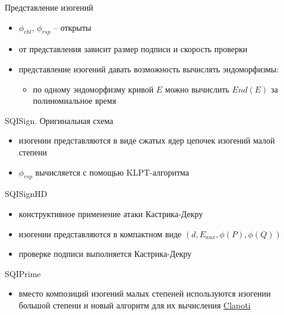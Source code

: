 \documentclass{beamer}
\begin{document}
\begin{frame}{Представление изогений}
	\begin{itemize}
		\item $\phi_{chl}$, $\phi_{rsp}$ -- открыты
		\item от представления зависит размер подписи и скорость проверки
		\item представление изогений  давать возможность вычислять эндоморфизмы:
		\begin{itemize}
			\item по одному эндоморфизму кривой $E$ можно вычислить $End(E)$ за полиномиальное время
		\end{itemize}
	\end{itemize}
\end{frame}

\begin{frame}{SQISign. Оригинальная схема}
	\begin{itemize}
		\item изогении представляются в виде сжатых ядер цепочек изогений малой степени
		\item $\phi_{rsp}$ вычисляется с помощью KLPT-алгоритма
	\end{itemize}
\end{frame}

\begin{frame}{SQISignHD}
	\begin{itemize}
		\item конструктивное применение атаки Кастрика-Декру
		\item изогении представляются в компактном виде $(d, E_{aux}, \phi(P), \phi(Q))$
		\item проверке подписи выполняется Кастрика-Декру
	\end{itemize}
\end{frame}

\begin{frame}{SQIPrime}
	\begin{itemize}
		\item вместо композиций изогений малых степеней используются изогении большой степени и новый алгоритм для их вычисления \href{https://eprint.iacr.org/2023/1766}{Clapoti}
	\end{itemize}
\end{frame}
\end{document}
